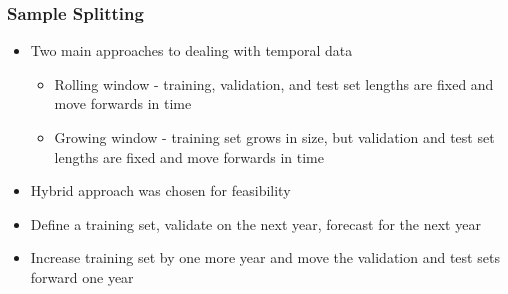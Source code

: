 \documentclass[]{beamer}
\begin{document}
\begin{frame}
\frametitle{Sample Splitting}
\begin{itemize}
	\item Two main approaches to dealing with temporal data
	\begin{itemize}
		\item Rolling window - training, validation, and test set lengths are fixed and move forwards in time
		\item Growing window - training set grows in size, but validation and test set lengths are fixed and move forwards in time
	\end{itemize}
	\item Hybrid approach was chosen for feasibility
	\item Define a training set, validate on the next year, forecast for the next year
	\item Increase training set by one more year and move the validation and test sets forward one year
\end{itemize}
\end{frame}
\end{document}
